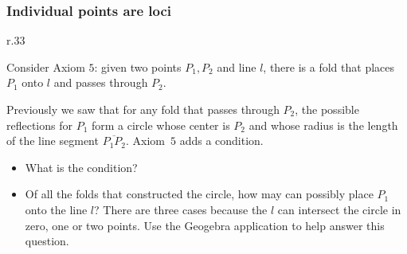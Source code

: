 
\subsubsection{Individual points are loci}

\begin{wrapfigure}[7]{r}{.33\textwidth}
\begin{center}
\vspace{-6ex}
\end{center}
\end{wrapfigure}
Consider Axiom $5$: given two points $P_1,P_2$ and line $l$, there is a fold that places $P_1$ onto $l$ and passes through $P_2$.

Previously we saw that for any fold that passes through $P_2$, the possible reflections for $P_1$ form a circle whose center is $P_2$ and whose radius is the length of the line segment $\overline{P_1P_2}$. Axiom~$5$ adds a condition.

\begin{itemize}
\item What is the condition?
\item Of all the folds that constructed the circle, how may can possibly place $P_1$ onto the line $l$? There are three cases because the $l$ can intersect the circle in zero, one or two points. Use the Geogebra application to help answer this question.
\end{itemize}

